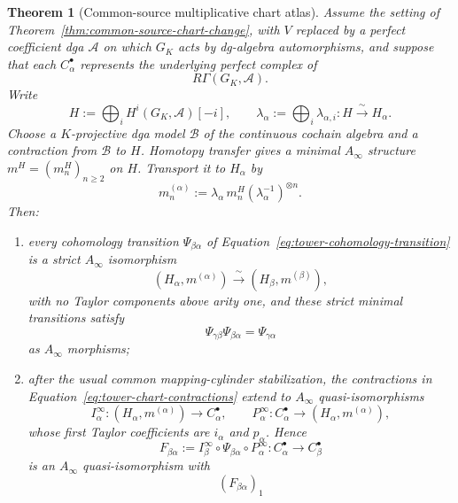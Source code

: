 \documentclass[11pt]{article}
\newtheorem{theorem}{Theorem}[section]
\theoremstyle{definition}
\begin{document}
\begin{theorem}[Common-source multiplicative chart atlas]\label{thm:common-source-multiplicative-tower}
Assume the setting of Theorem~\ref{thm:common-source-chart-change}, with $V$ replaced by a perfect coefficient dga $\mathcal A$ on which $G_K$ acts by dg-algebra automorphisms, and suppose that each $C_\alpha^\bullet$ represents the underlying perfect complex of
\[
 R\Gamma(G_K,\mathcal A).
\]
Write
\[
 H:=\bigoplus_i H^i(G_K,\mathcal A)[-i],
 \qquad
 \lambda_\alpha:=\bigoplus_i\lambda_{\alpha,i}:H\xrightarrow{\ \sim\ }H_\alpha.
\]
Choose a $K$-projective dga model $\mathcal B$ of the continuous cochain algebra and a contraction from $\mathcal B$ to $H$.  Homotopy transfer gives a minimal $A_\infty$ structure $m^H=(m_n^H)_{n\ge2}$ on $H$.  Transport it to $H_\alpha$ by
\begin{equation}\label{eq:tower-minimal-ainfty-transport}
 m_n^{(\alpha)}
 :=\lambda_\alpha\,m_n^H
   (\lambda_\alpha^{-1})^{\otimes n}.
\end{equation}
Then:
\begin{enumerate}[label=\textnormal{(\roman*)}]
\item every cohomology transition $\Psi_{\beta\alpha}$ of Equation~\eqref{eq:tower-cohomology-transition} is a strict $A_\infty$ isomorphism
\[
 (H_\alpha,m^{(\alpha)})
 \xrightarrow{\ \sim\ }
 (H_\beta,m^{(\beta)}),
\]
with no Taylor components above arity one, and these strict minimal transitions satisfy
\begin{equation}\label{eq:minimal-ainfty-tower-transitivity}
 \Psi_{\gamma\beta}\Psi_{\beta\alpha}
 =\Psi_{\gamma\alpha}
\end{equation}
as $A_\infty$ morphisms;
\item after the usual common mapping-cylinder stabilization, the contractions in Equation~\eqref{eq:tower-chart-contractions} extend to $A_\infty$ quasi-isomorphisms
\[
 I_\alpha^\infty:(H_\alpha,m^{(\alpha)})\longrightarrow C_\alpha^\bullet,
 \qquad
 P_\alpha^\infty:C_\alpha^\bullet\longrightarrow(H_\alpha,m^{(\alpha)}),
\]
whose first Taylor coefficients are $i_\alpha$ and $p_\alpha$.  Hence
\begin{equation}\label{eq:multiplicative-tower-transition}
 F_{\beta\alpha}
 :=I_\beta^\infty\circ\Psi_{\beta\alpha}\circ P_\alpha^\infty
 :C_\alpha^\bullet\longrightarrow C_\beta^\bullet
\end{equation}
is an $A_\infty$ quasi-isomorphism with
\begin{equation}\label{eq:multiplicative-tower-linear-term}
 (F_{\beta\alpha})_1

\end{equation}
\end{enumerate}
\end{theorem}
\end{document}
